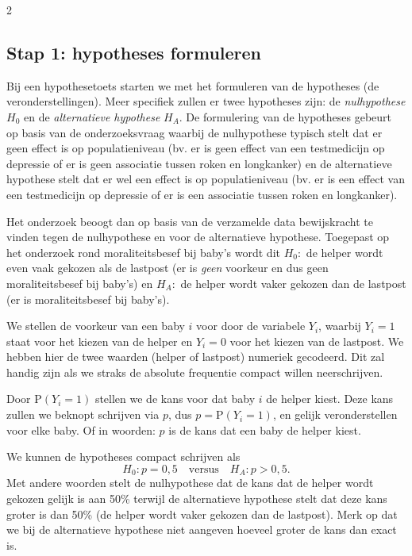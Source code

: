 \begin{multicols}{2}
\subsection*{Stap 1: hypotheses formuleren}

Bij een hypothesetoets starten we met het formuleren van de hypotheses (de veronderstellingen). Meer specifiek zullen er twee hypotheses zijn: de \emph{nulhypothese} \(H_0\) en de \emph{alternatieve hypothese} \(H_A\). De formulering van de hypotheses gebeurt op basis van de onderzoeksvraag waarbij de nulhypothese typisch stelt dat er geen effect is op populatieniveau (bv. er is geen effect van een testmedicijn op depressie of er is geen associatie tussen roken en longkanker) en de alternatieve hypothese stelt dat er wel een effect is op populatieniveau (bv. er is een effect van een testmedicijn op depressie of er is een associatie tussen roken en longkanker). 

Het onderzoek beoogt dan op basis van de verzamelde data bewijskracht te vinden tegen de nulhypothese en voor de alternatieve hypothese. Toegepast op het onderzoek rond moraliteitsbesef bij baby's wordt dit \(H_0:\) de helper wordt even vaak gekozen als de lastpost (er is \emph{geen} voorkeur en dus geen moraliteitsbesef bij baby's) en \(H_A:\) de helper wordt vaker gekozen dan de lastpost (er is moraliteitsbesef bij baby's).  

We stellen de voorkeur van een baby \(i\) voor door de variabele \(Y_i\), waarbij \(Y_i=1\) staat voor het kiezen van de helper en \(Y_i=0\) voor het kiezen van de lastpost. We hebben hier de twee waarden (helper of lastpost) numeriek gecodeerd. Dit zal handig zijn als we straks de absolute frequentie compact willen neerschrijven.

Door \(\textrm{P}(Y_i = 1)\) stellen we de kans voor dat baby \(i\) de helper kiest. Deze kans zullen we beknopt schrijven via \(p\), dus \(p = \textrm{P}(Y_i = 1)\), en gelijk veronderstellen voor elke baby. Of in woorden: \(p\) is de kans dat een baby de helper kiest.

We kunnen de hypotheses compact schrijven als
\[
H_0: p = 0,5 \quad \text{versus} \quad H_A:  p > 0,5. 
\]
Met andere woorden stelt de nulhypothese dat de kans dat de helper wordt gekozen gelijk is aan 50\% terwijl de alternatieve hypothese stelt dat deze kans groter is dan 50\% (de helper wordt vaker gekozen dan de lastpost). Merk op dat we bij de alternatieve hypothese niet aangeven hoeveel groter de kans dan exact is.


\end{multicols}
